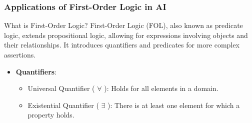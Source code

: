\documentclass[aspectratio=169]{beamer}
\begin{document}
\begin{frame}[fragile]
    \frametitle{Applications of First-Order Logic in AI}
    \begin{block}{What is First-Order Logic?}
        First-Order Logic (FOL), also known as predicate logic, extends propositional logic, allowing for expressions involving objects and their relationships. It introduces quantifiers and predicates for more complex assertions.
    \end{block}
    
    \begin{itemize}
        \item \textbf{Quantifiers}:
        \begin{itemize}
            \item Universal Quantifier ( $\forall$ ): Holds for all elements in a domain.
            \item Existential Quantifier ( $\exists$ ): There is at least one element for which a property holds.
        \end{itemize}
    \end{itemize}
\end{frame}
\end{document}
